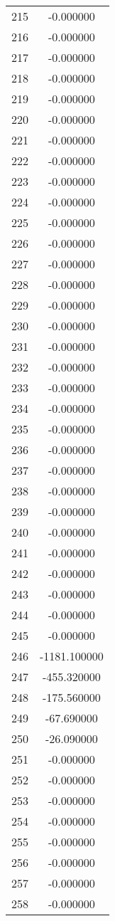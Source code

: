 \documentclass[12pt]{article}
\begin{document}
\begin{longtable}{@{}cc@{}}
215 & -0.000000 \\
216 & -0.000000 \\
217 & -0.000000 \\
218 & -0.000000 \\
219 & -0.000000 \\
220 & -0.000000 \\
221 & -0.000000 \\
222 & -0.000000 \\
223 & -0.000000 \\
224 & -0.000000 \\
225 & -0.000000 \\
226 & -0.000000 \\
227 & -0.000000 \\
228 & -0.000000 \\
229 & -0.000000 \\
230 & -0.000000 \\
231 & -0.000000 \\
232 & -0.000000 \\
233 & -0.000000 \\
234 & -0.000000 \\
235 & -0.000000 \\
236 & -0.000000 \\
237 & -0.000000 \\
238 & -0.000000 \\
239 & -0.000000 \\
240 & -0.000000 \\
241 & -0.000000 \\
242 & -0.000000 \\
243 & -0.000000 \\
244 & -0.000000 \\
245 & -0.000000 \\
246 & -1181.100000 \\
247 & -455.320000 \\
248 & -175.560000 \\
249 & -67.690000 \\
250 & -26.090000 \\
251 & -0.000000 \\
252 & -0.000000 \\
253 & -0.000000 \\
254 & -0.000000 \\
255 & -0.000000 \\
256 & -0.000000 \\
257 & -0.000000 \\
258 & -0.000000 \\

\end{longtable}
\end{document}
